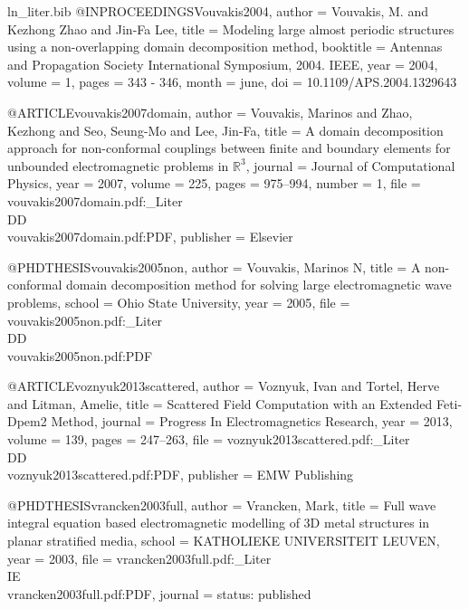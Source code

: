 \begin{filecontents*}{ln_liter.bib}
@INPROCEEDINGS{Vouvakis2004,
  author = {Vouvakis, M. and Kezhong Zhao and Jin-Fa Lee},
  title = {Modeling large almost periodic structures using a non-overlapping
	domain decomposition method},
  booktitle = {Antennas and Propagation Society International Symposium, 2004. IEEE},
  year = {2004},
  volume = {1},
  pages = {343 - 346},
  month = {june},
  doi = {10.1109/APS.2004.1329643}
}

@ARTICLE{vouvakis2007domain,
  author = {Vouvakis, Marinos and Zhao, Kezhong and Seo, Seung-Mo and Lee, Jin-Fa},
  title = {A domain decomposition approach for non-conformal couplings between
	finite and boundary elements for unbounded electromagnetic problems
	in $\mathbb{R}^3$},
  journal = {Journal of Computational Physics},
  year = {2007},
  volume = {225},
  pages = {975--994},
  number = {1},
  file = {vouvakis2007domain.pdf:_Liter\\DD\\vouvakis2007domain.pdf:PDF},
  publisher = {Elsevier}
}

@PHDTHESIS{vouvakis2005non,
  author = {Vouvakis, Marinos N},
  title = {A non-conformal domain decomposition method for solving large electromagnetic
	wave problems},
  school = {Ohio State University},
  year = {2005},
  file = {vouvakis2005non.pdf:_Liter\\DD\\vouvakis2005non.pdf:PDF}
}

@ARTICLE{voznyuk2013scattered,
  author = {Voznyuk, Ivan and Tortel, Herve and Litman, Amelie},
  title = {Scattered Field Computation with an Extended Feti-Dpem2 Method},
  journal = {Progress In Electromagnetics Research},
  year = {2013},
  volume = {139},
  pages = {247--263},
  file = {voznyuk2013scattered.pdf:_Liter\\DD\\voznyuk2013scattered.pdf:PDF},
  publisher = {EMW Publishing}
}

@PHDTHESIS{vrancken2003full,
  author = {Vrancken, Mark},
  title = {Full wave integral equation based electromagnetic modelling of {3D}
	metal structures in planar stratified media},
  school = {KATHOLIEKE UNIVERSITEIT LEUVEN},
  year = {2003},
  file = {vrancken2003full.pdf:_Liter\\IE\\vrancken2003full.pdf:PDF},
  journal = {status: published}
}


\end{filecontents*}
